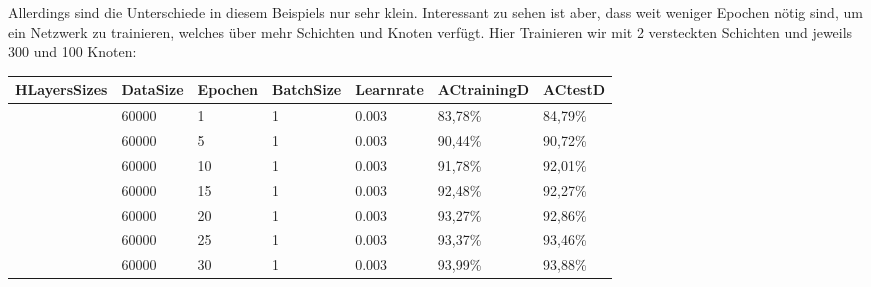 \documentclass[12pt]{article}
\begin{document}
	Allerdings sind die Unterschiede in diesem Beispiels nur sehr klein. Interessant zu sehen ist aber, dass weit weniger Epochen nötig sind, um ein Netzwerk zu trainieren, welches über mehr Schichten und Knoten verfügt. Hier Trainieren wir mit 2 versteckten Schichten und jeweils 300 und 100 Knoten:
\begin{table}[H]
    \centering
    \begin{tabular}{|l|l|l|l|l|l|l|}
    \hline
        HLayersSizes & DataSize & Epochen & BatchSize & Learnrate & ACtrainingD & ACtestD \\ \hline
        [784, 300, 100, 10] & 60000 & 1 & 1 & 0.003 & 83,78\% & 84,79\% \\ \hline
        [784, 300, 100, 10] & 60000 & 5 & 1 & 0.003 & 90,44\% & 90,72\% \\ \hline
        [784, 300, 100, 10] & 60000 & 10 & 1 & 0.003 & 91,78\% & 92,01\% \\ \hline
        [784, 300, 100, 10] & 60000 & 15 & 1 & 0.003 & 92,48\% & 92,27\% \\ \hline
        [784, 300, 100, 10] & 60000 & 20 & 1 & 0.003 & 93,27\% & 92,86\% \\ \hline
        [784, 300, 100, 10] & 60000 & 25 & 1 & 0.003 & 93,37\% & 93,46\% \\ \hline
        [784, 300, 100, 10] & 60000 & 30 & 1 & 0.003 & 93,99\% & 93,88\% \\ \hline
    \end{tabular}
\end{table}
\end{document}
